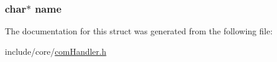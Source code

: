 \subsubsection[{\texorpdfstring{name}{name}}]{\setlength{\rightskip}{0pt plus 5cm}char$\ast$ name}\hypertarget{structfunction_def_a5ac083a645d964373f022d03df4849c8}{}\label{structfunction_def_a5ac083a645d964373f022d03df4849c8}


The documentation for this struct was generated from the following file\+:\begin{DoxyCompactItemize}
\item 
include/core/\hyperlink{com_handler_8h}{com\+Handler.\+h}\end{DoxyCompactItemize}
